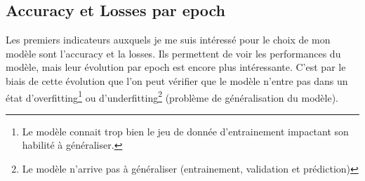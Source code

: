 \documentclass[a4paper,12pt]{report}
\begin{document}
      \subsection{Accuracy et Losses par epoch}
      Les premiers indicateurs auxquels je me suis intéressé pour le choix de mon modèle sont l'accuracy et la losses. Ils permettent de voir les performances du modèle, mais leur évolution par epoch est encore plus intéressante. C'est par le biais de cette évolution que l'on peut vérifier que le modèle n'entre pas dans un état d'overfitting\footnote{Le modèle connait trop bien le jeu de donnée d'entrainement impactant son habilité à généraliser.} ou d'underfitting\footnote{Le modèle n'arrive pas à généraliser (entrainement, validation et prédiction)} (problème de généralisation du modèle).
      \medbreak
      \begin{figure}[!h]%
        \centering
        \qquad

\end{figure}
\end{document}
